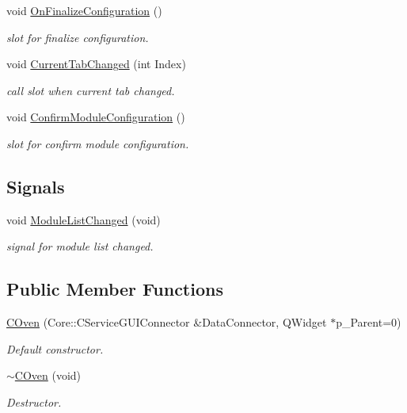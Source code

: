 \begin{DoxyCompactItemize}
void \hyperlink{classSystemTracking_1_1COven_a005a414099029c091d4f66d3fa278c5f}{\-On\-Finalize\-Configuration} ()
\begin{DoxyCompactList}\small\item\em slot for finalize configuration. \end{DoxyCompactList}\item 
void \hyperlink{classSystemTracking_1_1COven_aec6d73386eaee26ffc0163132799909b}{\-Current\-Tab\-Changed} (int \-Index)
\begin{DoxyCompactList}\small\item\em call slot when current tab changed. \end{DoxyCompactList}\item 
void \hyperlink{classSystemTracking_1_1COven_a6bafbf2ed2a9960b95029269c23695fa}{\-Confirm\-Module\-Configuration} ()
\begin{DoxyCompactList}\small\item\em slot for confirm module configuration. \end{DoxyCompactList}\end{DoxyCompactItemize}
\subsection*{\-Signals}
\begin{DoxyCompactItemize}
\item 
void \hyperlink{classSystemTracking_1_1COven_ac543524d55e5c3f9b53533a9367fd7fa}{\-Module\-List\-Changed} (void)
\begin{DoxyCompactList}\small\item\em signal for module list changed. \end{DoxyCompactList}\end{DoxyCompactItemize}
\subsection*{\-Public \-Member \-Functions}
\begin{DoxyCompactItemize}
\item 
\hyperlink{classSystemTracking_1_1COven_a84561c637cffc6d3312fca1f19728f00}{\-C\-Oven} (\-Core\-::\-C\-Service\-G\-U\-I\-Connector \&\-Data\-Connector, \-Q\-Widget $\ast$p\-\_\-\-Parent=0)
\begin{DoxyCompactList}\small\item\em \-Default constructor. \end{DoxyCompactList}\item 
\hyperlink{classSystemTracking_1_1COven_a6a297a1d49bc30d69c9d674028227419}{$\sim$\-C\-Oven} (void)
\begin{DoxyCompactList}\small\item\em \-Destructor. \end{DoxyCompactList}\end{DoxyCompactItemize}


